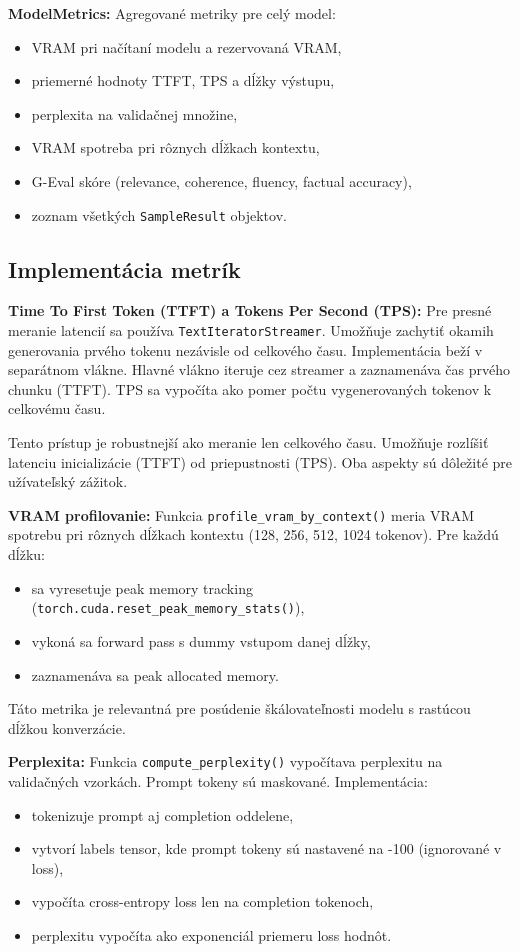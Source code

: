 \textbf{ModelMetrics:} Agregované metriky pre celý model:
\begin{itemize}
    \item VRAM pri načítaní modelu a rezervovaná VRAM,
    \item priemerné hodnoty TTFT, TPS a dĺžky výstupu,
    \item perplexita na validačnej množine,
    \item VRAM spotreba pri rôznych dĺžkach kontextu,
    \item G-Eval skóre (relevance, coherence, fluency, factual accuracy),
    \item zoznam všetkých \texttt{SampleResult} objektov.
\end{itemize}
 
\subsection{Implementácia metrík}
 
\textbf{Time To First Token (TTFT) a Tokens Per Second (TPS):}
Pre presné meranie latencií sa používa \texttt{TextIteratorStreamer}. Umožňuje zachytiť okamih generovania prvého tokenu nezávisle od celkového času. Implementácia beží v separátnom vlákne. Hlavné vlákno iteruje cez streamer a zaznamenáva čas prvého chunku (TTFT). TPS sa vypočíta ako pomer počtu vygenerovaných tokenov k celkovému času.
 
Tento prístup je robustnejší ako meranie len celkového času. Umožňuje rozlíšiť latenciu inicializácie (TTFT) od priepustnosti (TPS). Oba aspekty sú dôležité pre užívateľský zážitok.
 
\textbf{VRAM profilovanie:}
Funkcia \texttt{profile\_vram\_by\_context()} meria VRAM spotrebu pri rôznych dĺžkach kontextu (128, 256, 512, 1024 tokenov). Pre každú dĺžku:
\begin{itemize}
    \item sa vyresetuje peak memory tracking (\texttt{torch.cuda.reset\_peak\_memory\_stats()}),
    \item vykoná sa forward pass s dummy vstupom danej dĺžky,
    \item zaznamenáva sa peak allocated memory.
\end{itemize}
 
Táto metrika je relevantná pre posúdenie škálovateľnosti modelu s rastúcou dĺžkou konverzácie.
 
\textbf{Perplexita:}
Funkcia \texttt{compute\_perplexity()} vypočítava perplexitu na validačných vzorkách. Prompt tokeny sú maskované. Implementácia:
\begin{itemize}
    \item tokenizuje prompt aj completion oddelene,
    \item vytvorí labels tensor, kde prompt tokeny sú nastavené na -100 (ignorované v loss),
    \item vypočíta cross-entropy loss len na completion tokenoch,
    \item perplexitu vypočíta ako exponenciál priemeru loss hodnôt.
\end{itemize}
 
